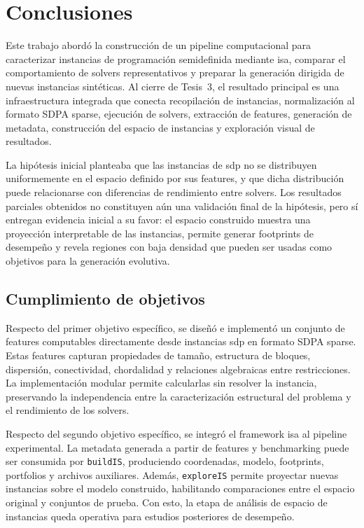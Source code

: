 \chapter{Conclusiones}
\label{ch:conclu}

Este trabajo abordó la construcción de un pipeline computacional para caracterizar
instancias de programación semidefinida mediante \acrshort{isa}, comparar el
comportamiento de solvers representativos y preparar la generación dirigida de nuevas
instancias sintéticas.
Al cierre de Tesis~3, el resultado principal es una infraestructura integrada que
conecta recopilación de instancias, normalización al formato SDPA sparse, ejecución de
solvers, extracción de features, generación de metadata, construcción del espacio de
instancias y exploración visual de resultados.

La hipótesis inicial planteaba que las instancias de \acrshort{sdp} no se distribuyen
uniformemente en el espacio definido por sus features, y que dicha distribución puede
relacionarse con diferencias de rendimiento entre solvers.
Los resultados parciales obtenidos no constituyen aún una validación final de la
hipótesis, pero sí entregan evidencia inicial a su favor: el espacio construido muestra
una proyección interpretable de las instancias, permite generar footprints de
desempeño y revela regiones con baja densidad que pueden ser usadas como objetivos
para la generación evolutiva.

\section{Cumplimiento de objetivos}
\label{sec:conclusiones_objetivos}

Respecto del primer objetivo específico, se diseñó e implementó un conjunto de
features computables directamente desde instancias \acrshort{sdp} en formato SDPA
sparse.
Estas features capturan propiedades de tamaño, estructura de bloques, dispersión,
conectividad, chordalidad y relaciones algebraicas entre restricciones.
La implementación modular permite calcularlas sin resolver la instancia, preservando
la independencia entre la caracterización estructural del problema y el rendimiento de
los solvers.

Respecto del segundo objetivo específico, se integró el framework \acrshort{isa} al
pipeline experimental.
La metadata generada a partir de features y benchmarking puede ser consumida por
\texttt{buildIS}, produciendo coordenadas, modelo, footprints, portfolios y archivos
auxiliares.
Además, \texttt{exploreIS} permite proyectar nuevas instancias sobre el modelo
construido, habilitando comparaciones entre el espacio original y conjuntos de prueba.
Con esto, la etapa de análisis de espacio de instancias queda operativa para estudios
posteriores de desempeño.

